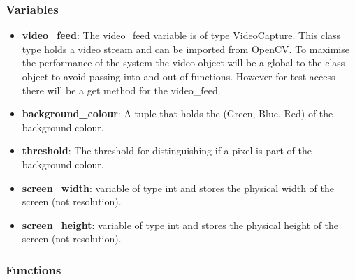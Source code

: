 \documentclass{article}
\begin{document}
\subsubsection{Variables}
\begin{itemize}

	\item \textbf{video\_feed}: The video\_feed variable is of type VideoCapture. This class type holds a video stream and can be imported from OpenCV. To maximise the performance of the system the video object will be a global to the class object to avoid passing into and out of functions. However for test access there will be a get method for the video\_feed.
	
	\item \textbf{background\_colour}: A tuple that holds the (Green, Blue, Red) of the background colour.
	
	\item \textbf{threshold}: The threshold for distinguishing if a pixel is part of the background colour.
	
	\item \textbf{screen\_width}: variable of type int and stores the physical width of the screen (not resolution).
	
	\item \textbf{screen\_height}: variable of type int and stores the physical height of the screen (not resolution).

\end{itemize}

\subsubsection{Functions}
\end{document}
